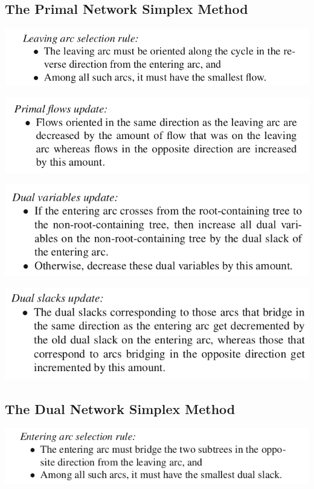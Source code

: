 \documentclass[11pt]{article}
\begin{document}
\subsection{The Primal Network Simplex Method}
\label{sec:org54c52b0}
\begin{center}
\includegraphics[width=.9\linewidth]{Network Flow Problems/screenshot_2019-03-03_12-49-34.png}
\end{center}

\begin{center}
\includegraphics[width=.9\linewidth]{Network Flow Problems/screenshot_2019-03-03_12-49-41.png}
\end{center}

\begin{center}
\includegraphics[width=.9\linewidth]{Network Flow Problems/screenshot_2019-03-03_12-51-34.png}
\end{center}

\begin{center}
\includegraphics[width=.9\linewidth]{Network Flow Problems/screenshot_2019-03-03_12-51-45.png}
\end{center} 

\subsection{The Dual Network Simplex Method}
\label{sec:org651ab26}
\begin{center}
\includegraphics[width=.9\linewidth]{Network Flow Problems/screenshot_2019-03-03_13-18-36.png}
\end{center}
\end{document}
